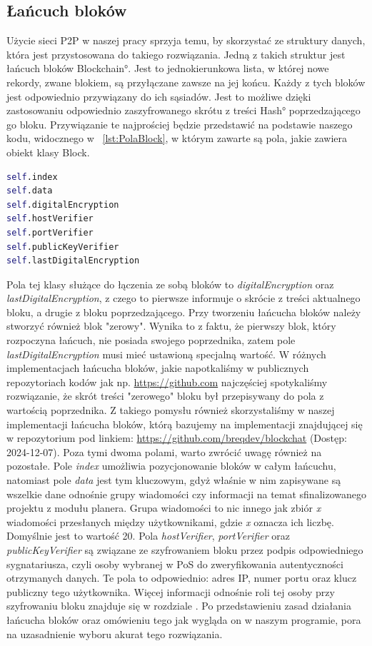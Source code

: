 \subsection{Łańcuch bloków}
\label{sec:Blockchain}
Użycie sieci P2P w naszej pracy sprzyja temu, by skorzystać ze struktury danych, która jest przystosowana do takiego rozwiązania. Jedną z takich struktur jest łańcuch bloków \ang{Blockchain}. Jest to jednokierunkowa lista, w której nowe rekordy, zwane blokiem, są przyłączane zawsze na jej końcu. Każdy z tych bloków jest odpowiednio przywiązany do ich sąsiadów. Jest to możliwe dzięki zastosowaniu odpowiednio zaszyfrowanego skrótu z treści \ang{Hash} poprzedzającego go bloku. Przywiązanie te najprościej będzie przedstawić na podstawie naszego kodu, widocznego w \lstlistingname{~\ref{lst:PolaBlock}}, w którym zawarte są pola, jakie zawiera obiekt klasy Block.
\begin{lstlisting}[language=Python, extendedchars=true, caption={Pola obiektu klasy Block}, label={lst:PolaBlock}]
self.index
self.data
self.digitalEncryption
self.hostVerifier
self.portVerifier
self.publicKeyVerifier
self.lastDigitalEncryption
\end{lstlisting}
Pola tej klasy służące do łączenia ze sobą bloków to \textit{digitalEncryption} oraz \textit{lastDigitalEncryption}, z czego to pierwsze informuje o skrócie z treści aktualnego bloku, a drugie z bloku poprzedzającego. Przy tworzeniu łańcucha bloków należy stworzyć również blok "zerowy". Wynika to z faktu, że pierwszy blok, który rozpoczyna łańcuch, nie posiada swojego poprzednika, zatem pole \textit{lastDigitalEncryption} musi mieć ustawioną specjalną wartość. W różnych implementacjach łańcucha bloków, jakie napotkaliśmy w publicznych repozytoriach kodów jak np. \url{https://github.com} najczęściej spotykaliśmy rozwiązanie, że skrót treści "zerowego" bloku był przepisywany do pola z  wartością poprzednika. Z takiego pomysłu również skorzystaliśmy w naszej implementacji łańcucha bloków, którą bazujemy na implementacji znajdującej się w repozytorium pod linkiem: \url{https://github.com/breqdev/blockchat} (Dostęp: 2024-12-07). Poza tymi dwoma polami, warto zwrócić uwagę również na pozostałe. Pole \textit{index} umożliwia pozycjonowanie bloków w całym łańcuchu, natomiast pole \textit{data} jest tym kluczowym, gdyż właśnie w nim zapisywane są wszelkie dane odnośnie grupy wiadomości czy informacji na temat sfinalizowanego projektu z modułu planera. Grupa wiadomości to nic innego jak zbiór \textit{x} wiadomości przesłanych między użytkownikami, gdzie \textit{x} oznacza ich liczbę. Domyślnie jest to wartość 20. Pola \textit{hostVerifier}, \textit{portVerifier} oraz \textit{publicKeyVerifier} są związane ze szyfrowaniem bloku przez podpis odpowiedniego sygnatariusza, czyli osoby wybranej w PoS do zweryfikowania autentyczności otrzymanych danych. Te pola to odpowiednio: adres IP, numer portu oraz klucz publiczny tego użytkownika. Więcej informacji odnośnie roli tej osoby przy szyfrowaniu bloku znajduje się w rozdziale . Po przedstawieniu zasad działania łańcucha bloków oraz omówieniu tego jak wygląda on w naszym programie, pora na uzasadnienie wyboru akurat tego rozwiązania.